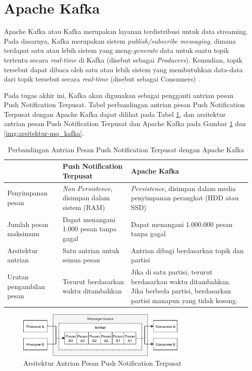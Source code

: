 \section{Apache Kafka}
\par Apache Kafka atau Kafka merupakan layanan terdistribusi untuk data streaming. Pada dasarnya, Kafka merupakan sistem \textit{publish/subscribe messaging}, dimana terdapat satu atau lebih sistem yang meng-\textit{generate} data untuk suatu topik tertentu secara \textit{real-time} di Kafka (disebut sebagai \textit{Producers}). Kemudian, topik tersebut dapat dibaca oleh satu atau lebih sistem yang membutuhkan data-data dari topik tersebut secara \textit{real-time} (disebut sebagai Consumers) \cite{kafka-online}.
\par Pada tugas akhir ini, Kafka akan digunakan sebagai pengganti antrian pesan Push Notification Terpusat. Tabel perbandingan antrian pesan Push Notification Terpusat dengan Apache Kafka dapat dilihat pada Tabel \ref{t:perbandingan_kafka}, dan arsitektur antrian pesan Push Notification Terpusat dan Apache Kafka pada Gambar \ref{img:arsitektur-mq_pnt} dan \ref{img:arsitektur-mq_kafka}.
\begin{longtable}{|p{2.5cm}|p{3.5cm}|p{3.5cm}|}
	\caption{Perbandingan Antrian Pesan Push Notification Terpusat dengan Apache Kafka} \label{t:perbandingan_kafka} \\ \hline
	\rowcolor{lightgray} & Push Notification Terpusat & Apache Kafka \\ \hline
	Penyimpanan pesan & \textit{Non Persistence}, disimpan dalam sistem (RAM) & \textit{Persistence}, disimpan dalam media penyimpanan perangkat (HDD atau SSD) \\ \hline
	Jumlah pesan maksimum & Dapat menangani 1.000 pesan tanpa gagal & Dapat menangani 1.000.000 pesan tanpa gagal \\ \hline
	Arsitektur antrian & Satu antrian untuk semua pesan & Antrian dibagi berdasarkan topik dan partisi \\ \hline
	Urutan pengambilan pesan & Terurut berdasarkan waktu ditambahkan & Jika di satu partisi, terurut berdasarkan waktu ditambahkan. Jika berbeda partisi, berdasarkan partisi manapun yang tidak kosong. \\ \hline
\end{longtable}
\begin{figure}[H]
\centering\includegraphics[width=0.75\textwidth]{bab2/img/arsitektur-mq_pnt.jpg}
\caption{Arsitektur Antrian Pesan Push Notification Terpusat}
\label{img:arsitektur-mq_pnt}
\end{figure}

